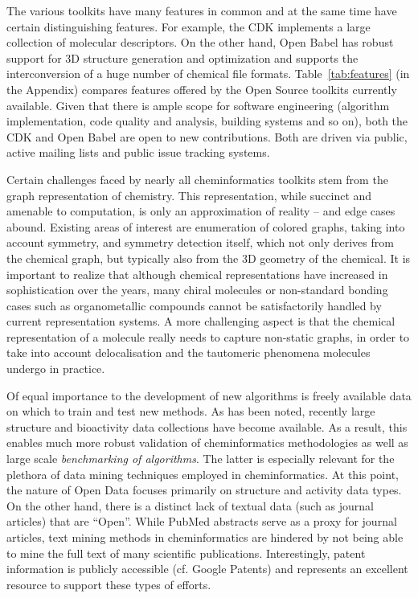 \documentclass{sig-alternate}
\begin{document}
The various toolkits have many features in common and at the same time
have certain distinguishing features. For example, the CDK implements
a large collection of molecular descriptors. On the other hand, Open
Babel has robust support for 3D structure generation and optimization
and supports the interconversion of a huge number of chemical file
formats. Table~\ref{tab:features} (in the Appendix) compares features
offered by the Open Source toolkits currently available.  Given that
there is ample scope for software engineering (algorithm
implementation, code quality and analysis, building systems and so on), both
the CDK and Open Babel are open to new contributions. Both are driven
via public, active mailing lists and public issue tracking systems.

Certain challenges faced by nearly all cheminformatics toolkits stem
from the graph representation of chemistry. This representation, while
succinct and amenable to computation, is only an approximation of
reality -- and edge cases abound. Existing areas of interest are
enumeration of colored graphs, taking into account symmetry, and
symmetry detection itself, which not only derives from the chemical
graph, but typically also from the 3D geometry of the chemical. It is
important to realize that although chemical representations have
increased in sophistication over the years, many chiral molecules or
non-standard bonding cases such as organometallic compounds cannot be
satisfactorily handled by current representation systems. A more
challenging aspect is that the chemical representation of a molecule
really needs to capture non-static graphs, in order to take into
account delocalisation and the tautomeric phenomena molecules undergo
in practice.

Of equal importance to the development of new algorithms is freely
available data on which to train and test new methods. As has been
noted, recently large structure and bioactivity data collections have
become available. As a result, this enables much more robust
validation of cheminformatics methodologies as well as large scale
\emph{benchmarking of algorithms}. The latter is especially relevant
for the plethora of data mining techniques employed in
cheminformatics. At this point, the nature of Open Data focuses
primarily on structure and activity data types. On the other hand,
there is a distinct lack of textual data (such as journal articles)
that are ``Open''. While PubMed abstracts serve as a proxy
for journal articles, text mining methods in cheminformatics are
hindered by not being able to mine the full text of many scientific
publications.  Interestingly, patent information is publicly
accessible (cf. Google Patents) and represents an excellent resource
to support these types of efforts.
\end{document}
